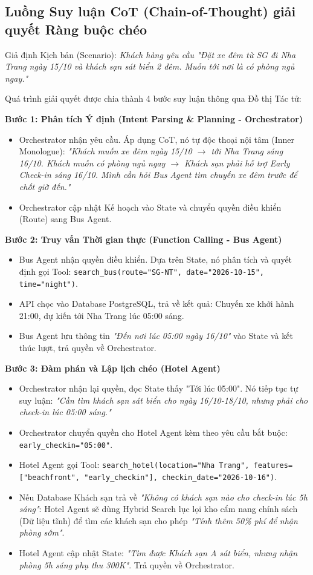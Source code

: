 \subsection{Luồng Suy luận CoT (Chain-of-Thought) giải quyết Ràng buộc chéo}

Giả định Kịch bản (Scenario): \textit{Khách hàng yêu cầu "Đặt xe đêm từ SG đi Nha Trang ngày 15/10 và khách sạn sát biển 2 đêm. Muốn tới nơi là có phòng ngủ ngay."}

Quá trình giải quyết được chia thành 4 bước suy luận thông qua Đồ thị Tác tử:

\textbf{Bước 1: Phân tích Ý định (Intent Parsing \& Planning - Orchestrator)}
\begin{itemize}
    \item Orchestrator nhận yêu cầu. Áp dụng CoT, nó tự độc thoại nội tâm (Inner Monologue): \textit{"Khách muốn xe đêm ngày 15/10 $\rightarrow$ tới Nha Trang sáng 16/10. Khách muốn có phòng ngủ ngay $\rightarrow$ Khách sạn phải hỗ trợ Early Check-in sáng 16/10. Mình cần hỏi Bus Agent tìm chuyến xe đêm trước để chốt giờ đến."}
    \item Orchestrator cập nhật Kế hoạch vào State và chuyển quyền điều khiển (Route) sang Bus Agent.
\end{itemize}

\textbf{Bước 2: Truy vấn Thời gian thực (Function Calling - Bus Agent)}
\begin{itemize}
    \item Bus Agent nhận quyền điều khiển. Dựa trên State, nó phân tích và quyết định gọi Tool: \texttt{search\_bus(route="SG-NT", date="2026-10-15", time="night")}.
    \item API chọc vào Database PostgreSQL, trả về kết quả: Chuyến xe khởi hành 21:00, dự kiến tới Nha Trang lúc 05:00 sáng.
    \item Bus Agent lưu thông tin \textit{"Đến nơi lúc 05:00 ngày 16/10"} vào State và kết thúc lượt, trả quyền về Orchestrator.
\end{itemize}

\textbf{Bước 3: Đàm phán và Lập lịch chéo (Hotel Agent)}
\begin{itemize}
    \item Orchestrator nhận lại quyền, đọc State thấy "Tới lúc 05:00". Nó tiếp tục tự suy luận: \textit{"Cần tìm khách sạn sát biển cho ngày 16/10-18/10, nhưng phải cho check-in lúc 05:00 sáng."}
    \item Orchestrator chuyển quyền cho Hotel Agent kèm theo yêu cầu bắt buộc: \texttt{early\_checkin="05:00"}.
    \item Hotel Agent gọi Tool: \texttt{search\_hotel(location="Nha Trang", features=["beachfront", "early\_checkin"], checkin\_date="2026-10-16")}.
    \item Nếu Database Khách sạn trả về \textit{"Không có khách sạn nào cho check-in lúc 5h sáng"}: Hotel Agent sẽ dùng Hybrid Search lục lọi kho cẩm nang chính sách (Dữ liệu tĩnh) để tìm các khách sạn cho phép \textit{"Tính thêm 50\% phí để nhận phòng sớm"}.
    \item Hotel Agent cập nhật State: \textit{"Tìm được Khách sạn A sát biển, nhưng nhận phòng 5h sáng phụ thu 300K"}. Trả quyền về Orchestrator.
\end{itemize}

